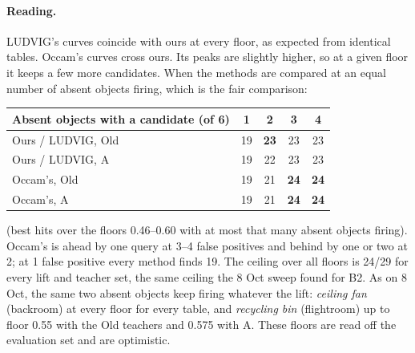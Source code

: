 \paragraph{Reading.} LUDVIG's curves coincide with ours at every floor, as expected from identical tables. Occam's
curves cross ours. Its peaks are slightly higher, so at a given floor it keeps a few more candidates. When the methods
are compared at an equal number of absent objects firing, which is the fair comparison:
\begin{center}\small
\begin{tabular}{lcccc}
\toprule
Absent objects with a candidate (of 6) & 1 & 2 & 3 & 4\\
\midrule
Ours / LUDVIG, Old & 19 & \textbf{23} & 23 & 23\\
Ours / LUDVIG, A   & 19 & 22 & 23 & 23\\
Occam's, Old       & 19 & 21 & \textbf{24} & \textbf{24}\\
Occam's, A         & 19 & 21 & \textbf{24} & \textbf{24}\\
\bottomrule
\end{tabular}
\end{center}
\noindent (best hits over the floors 0.46--0.60 with at most that many absent objects firing). Occam's is ahead by one query
at 3--4 false positives and behind by one or two at 2; at 1 false positive every method finds 19. The ceiling over
all floors is 24/29 for every lift and teacher set, the same ceiling the 8 Oct sweep found for B2. As on 8 Oct, the
same two absent objects keep firing whatever the lift: \emph{ceiling fan} (backroom) at every floor for every table,
and \emph{recycling bin} (flightroom) up to floor 0.55 with the Old teachers and 0.575 with A.
These floors are read off the evaluation set and are optimistic.
